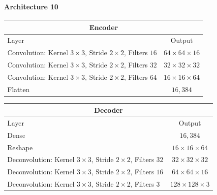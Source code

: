 \paragraph{Architecture 10}

\begin{center}
    \begin{table}[H]
        \centering
        \begin{tabular}{ | l | c | }
            \multicolumn{2}{c}{Encoder} \\ \hline
            Layer & Output\\ \hline
            Convolution: Kernel $3\times3$, Stride $2\times2$, Filters $16 $    & $64\times 64\times 16 $    \\  
            Convolution: Kernel $3\times3$, Stride $2\times2$, Filters $32 $    & $32\times 32\times 32 $    \\
            Convolution: Kernel $3\times3$, Stride $2\times2$, Filters $64 $    & $16\times 16\times 64 $    \\
            Flatten                                                             & $16,384$                    \\
            \hline
        \end{tabular}
    \end{table}
\end{center}
\vspace{-4em}
\begin{center}
    \begin{table}[H]
        \centering
        \begin{tabular}{ | l | c | }
            \multicolumn{2}{c}{Decoder} \\ \hline
            Layer & Output\\ \hline
            Dense                                                                   & $16,384$                   \\
            Reshape                                                                 & $16\times 16\times  64 $  \\ 
            Deconvolution: Kernel $3\times3$, Stride $2\times2$, Filters $32 $      & $32\times 32\times  32 $  \\
            Deconvolution: Kernel $3\times3$, Stride $2\times2$, Filters $16 $      & $64\times 64\times  16 $  \\
            Deconvolution: Kernel $3\times3$, Stride $2\times2$, Filters $3  $      & $128\times 128\times3  $  \\
            \hline
        \end{tabular} 
    \end{table}
\end{center}

